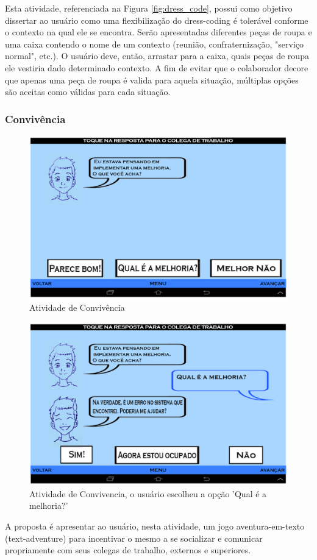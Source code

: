 \documentclass[12pt]{article}
\begin{document}
Esta atividade, referenciada na Figura \ref{fig:dress_code}, possui como objetivo dissertar ao usuário como uma flexibilização do dress-coding é tolerável conforme o contexto na qual ele se encontra. Serão apresentadas diferentes peças de roupa e uma caixa contendo o nome de um contexto (reunião, confraternização, "serviço normal", etc.). O usuário deve, então, arrastar para a caixa, quais peças de roupa ele vestiria dado determinado contexto. A fim de evitar que o colaborador decore que apenas uma peça de roupa é valida para aquela situação, múltiplas opções são aceitas como válidas para cada situação.

\subsubsection{Convivência}
 \begin{figure}[h!]
    \centering
    \includegraphics[width=1.0\textwidth]{convivencia1.png}
    \caption{ Atividade de Convivência }
    \label{fig:convivencia1}
\end{figure}
 \begin{figure}[h!]
    \centering
    \includegraphics[width=1.0\textwidth]{convivencia2.png}
    \caption{ Atividade de Convivencia, o usuário escolheu a opção 'Qual é a melhoria?' }
    \label{fig:convivencia2}
\end{figure}
A proposta é apresentar ao usuário, nesta atividade, um jogo aventura-em-texto (text-adventure) para incentivar o mesmo a se socializar e comunicar propriamente com seus colegas de trabalho, externos e superiores.
\end{document}
